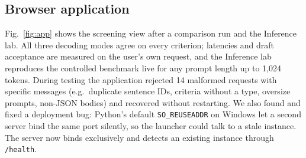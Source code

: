 \subsection{Browser application}
Fig.~\ref{fig:app} shows the screening view after a comparison run and the Inference lab. All three decoding modes agree on every criterion; latencies and draft acceptance are measured on the user's own request, and the Inference lab reproduces the controlled benchmark live for any prompt length up to 1{,}024 tokens. During testing the application rejected 14 malformed requests with specific messages (e.g.\ duplicate sentence IDs, criteria without a type, oversize prompts, non-JSON bodies) and recovered without restarting. We also found and fixed a deployment bug: Python's default \texttt{SO\_REUSEADDR} on Windows let a second server bind the same port silently, so the launcher could talk to a stale instance. The server now binds exclusively and detects an existing instance through \texttt{/health}.

